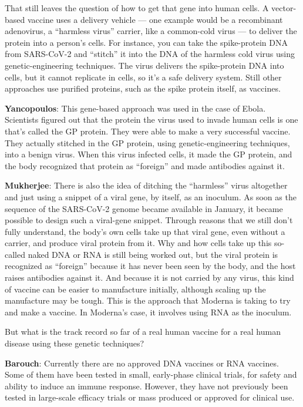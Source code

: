 That still leaves the question of how to get that gene into human cells.
A vector-based vaccine uses a delivery vehicle --- one example would be
a recombinant adenovirus, a ``harmless virus'' carrier, like a
common-cold virus --- to deliver the protein into a person's cells. For
instance, you can take the spike-protein DNA from SARS-CoV-2 and
``stitch'' it into the DNA of the harmless cold virus using
genetic-engineering techniques. The virus delivers the spike-protein DNA
into cells, but it cannot replicate in cells, so it's a safe delivery
system. Still other approaches use purified proteins, such as the spike
protein itself, as vaccines.

\textbf{Yancopoulos}: This gene-based approach was used in the case of
Ebola. Scientists figured out that the protein the virus used to invade
human cells is one that's called the GP protein. They were able to make
a very successful vaccine. They actually stitched in the GP protein,
using genetic-engineering techniques, into a benign virus. When this
virus infected cells, it made the GP protein, and the body recognized
that protein as ``foreign'' and made antibodies against it.

\textbf{Mukherjee}: There is also the idea of ditching the ``harmless''
virus altogether and just using a snippet of a viral gene, by itself, as
an inoculum. As soon as the sequence of the SARS-CoV-2 genome became
available in January, it became possible to design such a viral-gene
snippet. Through reasons that we still don't fully understand, the
body's own cells take up that viral gene, even without a carrier, and
produce viral protein from it. Why and how cells take up this so-called
naked DNA or RNA is still being worked out, but the viral protein is
recognized as ``foreign'' because it has never been seen by the body,
and the host raises antibodies against it. And because it is not carried
by any virus, this kind of vaccine can be easier to manufacture
initially, although scaling up the manufacture may be tough. This is the
approach that Moderna is taking to try and make a vaccine. In Moderna's
case, it involves using RNA as the inoculum.

But what is the track record so far of a real human vaccine for a real
human disease using these genetic techniques?

\textbf{Barouch}: Currently there are no approved DNA vaccines or RNA
vaccines. Some of them have been tested in small, early-phase clinical
trials, for safety and ability to induce an immune response. However,
they have not previously been tested in large-scale efficacy trials or
mass produced or approved for clinical use.

